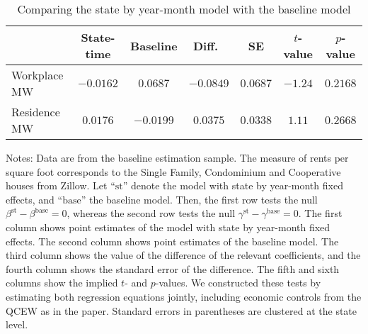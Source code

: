\begin{table}[hbt!]
    \centering
    \caption{Comparing the state by year-month model with the baseline model}
    \label{tab:test_stateFE}

    \begin{tabular}{@{}lcccccc@{}}
        \toprule
                     & State-time & Baseline & Diff.\ & SE      & $t$-value & $p$-value \\ \midrule
        Workplace MW & $-0.0162$      & $0.0687$    &  $-0.0849$ & $0.0687$   & $-1.24$     & $0.2168$ \\
        Residence MW & $0.0176$      & $-0.0199$    &  $0.0375$ & $0.0338$   & $1.11$     & $0.2668$ \\ \bottomrule
    \end{tabular}

    \begin{minipage}{.95\textwidth} \footnotesize
        \vspace{2mm}
        Notes: 
        Data are from the baseline estimation sample.
        The measure of rents per square foot corresponds to the Single Family, 
        Condominium and Cooperative houses from Zillow.
        Let ``$\text{st}$'' denote the model with state by year-month fixed effects,
        and ``$\text{base}$'' the baseline model.
        Then, the first row tests the null $\beta^{\text{st}} - \beta^{\text{base}} = 0$,
        whereas the second row tests the null $\gamma^{\text{st}} - \gamma^{\text{base}} = 0$.
        The first column shows point estimates of the model with state by year-month 
        fixed effects.
        The second column shows point estimates of the baseline model.
        The third column shows the value of the difference of the relevant coefficients,
        and the fourth column shows the standard error of the difference.
        The fifth and sixth columns show the implied $t$- and $p$-values.
        We constructed these tests by estimating both regression equations jointly, 
        including economic controls from the QCEW as in the paper.
        Standard errors in parentheses are clustered at the state level.
    \end{minipage}
\end{table}

